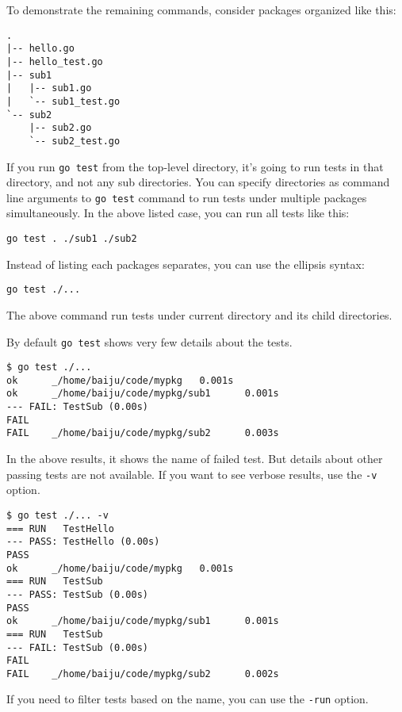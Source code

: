 To demonstrate the remaining commands, consider packages organized
like this:

\begin{lstlisting}[numbers=none]
.
|-- hello.go
|-- hello_test.go
|-- sub1
|   |-- sub1.go
|   `-- sub1_test.go
`-- sub2
    |-- sub2.go
    `-- sub2_test.go
\end{lstlisting}

If you run \texttt{go test} from the top-level directory, it's going
to run tests in that directory, and not any sub directories.  You can
specify directories as command line arguments to \texttt{go test}
command to run tests under multiple packages simultaneously.
In the above listed case, you can run all tests like this:

\begin{lstlisting}[numbers=none]
go test . ./sub1 ./sub2
\end{lstlisting}

Instead of listing each packages separates, you can use the ellipsis
syntax:

\begin{lstlisting}[numbers=none]
go test ./...
\end{lstlisting}

The above command run tests under current directory and its child
directories.

By default \texttt{go test} shows very few details about the tests.

\begin{lstlisting}[numbers=none]
$ go test ./...
ok      _/home/baiju/code/mypkg   0.001s
ok      _/home/baiju/code/mypkg/sub1      0.001s
--- FAIL: TestSub (0.00s)
FAIL
FAIL    _/home/baiju/code/mypkg/sub2      0.003s
\end{lstlisting}

In the above results, it shows the name of failed test.  But details
about other passing tests are not available.  If you want to see
verbose results, use the \texttt{-v} option.

\begin{lstlisting}[numbers=none]
$ go test ./... -v
=== RUN   TestHello
--- PASS: TestHello (0.00s)
PASS
ok      _/home/baiju/code/mypkg   0.001s
=== RUN   TestSub
--- PASS: TestSub (0.00s)
PASS
ok      _/home/baiju/code/mypkg/sub1      0.001s
=== RUN   TestSub
--- FAIL: TestSub (0.00s)
FAIL
FAIL    _/home/baiju/code/mypkg/sub2      0.002s
\end{lstlisting}

If you need to filter tests based on the name, you can use
the \texttt{-run} option.

